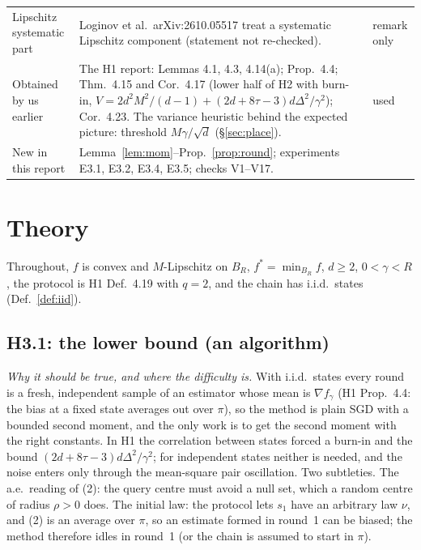 \documentclass[11pt,a4paper]{article}
\numberwithin{equation}{section}
\theoremstyle{definition}
\theoremstyle{remark}
\begin{document}
\begin{center}
\begin{tabularx}{\textwidth}{@{}p{2.6cm}Xp{2.5cm}@{}}
Lipschitz systematic part & Loginov et al.\ arXiv:2610.05517 treat a systematic Lipschitz component (statement not re-checked). & remark only \\
Obtained by us earlier & The H1 report: Lemmas 4.1, 4.3, 4.14(a); Prop.~4.4; Thm.~4.15 and Cor.~4.17 (lower half of H2 with burn-in, $V=2d^2M^2/(d-1)+(2d+8\tau-3)d\Delta^2/\gamma^2$); Cor.~4.23. The variance heuristic behind the expected picture: threshold $M\gamma/\sqrt d$ (\S\ref{sec:place}). & used \\
New in this report & Lemma~\ref{lem:mom}--Prop.~\ref{prop:round}; experiments E3.1, E3.2, E3.4, E3.5; checks V1--V17. & \\
\bottomrule
\end{tabularx}
\end{center}
\section{Theory}\label{sec:theory}
Throughout, $f$ is convex and $M$-Lipschitz on $B_R$, $f^*=\min_{B_R}f$, $d\ge2$, $0<\gamma<R$, the protocol is H1 Def.~4.19 with $q=2$, and the chain has i.i.d.\ states (Def.~\ref{def:iid}).

\subsection{H3.1: the lower bound (an algorithm)}\label{sec:lower}
\emph{Why it should be true, and where the difficulty is.} With i.i.d.\ states every round is a fresh, independent sample of an estimator whose mean is $\nabla f_\gamma$ (H1 Prop.~4.4: the bias at a fixed state averages out over $\pi$), so the method is plain SGD with a bounded second moment, and the only work is to get the second moment with the right constants. In H1 the correlation between states forced a burn-in and the bound $(2d+8\tau-3)d\Delta^2/\gamma^2$; for independent states neither is needed, and the noise enters only through the mean-square pair oscillation. Two subtleties. The a.e.\ reading of (2): the query centre must avoid a null set, which a random centre of radius $\rho>0$ does. The initial law: the protocol lets $s_1$ have an arbitrary law $\nu$, and (2) is an average over $\pi$, so an estimate formed in round~1 can be biased; the method therefore idles in round~1 (or the chain is assumed to start in $\pi$).
\end{document}
